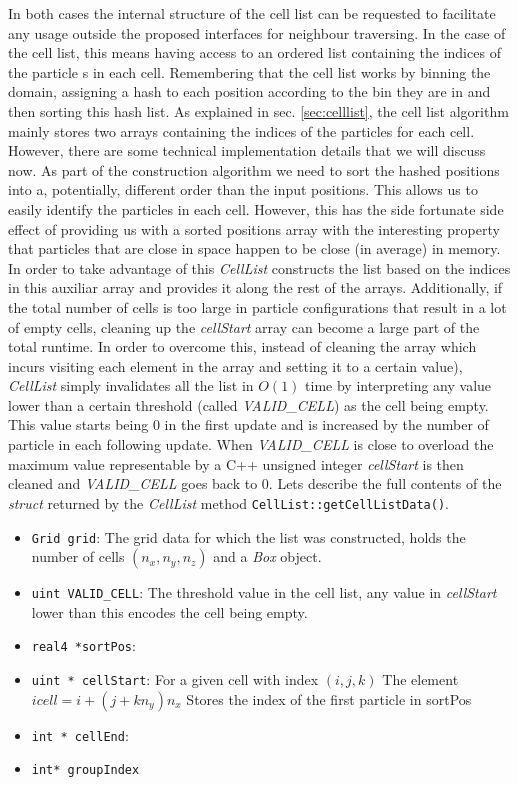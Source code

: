 \documentclass[ twoside,openright,titlepage,numbers=noenddot,%
headinclude,footinclude,cleardoublepage=empty,abstract=on,
BCOR=5mm,paper=a4,fontsize=11pt, dvipsnames
]{scrreprt}
\begin{document}
In both cases the internal structure of the cell list can be requested to facilitate any usage outside the proposed interfaces for neighbour traversing. In the case of the cell list, this means having access to an ordered list containing the indices of the particle s in each cell. Remembering that the cell list works by binning the domain, assigning a hash to each position according to the bin they are in and then sorting this hash list.
As explained in sec. \ref{sec:celllist}, the cell list algorithm mainly stores two arrays containing the indices of the particles for each cell.
However, there are some technical implementation details that we will discuss now.
As part of the construction algorithm we need to sort the hashed positions into a, potentially, different order than the input positions. This allows us to easily identify the particles in each cell. However, this has the side fortunate side effect of providing us with a sorted positions array with the interesting property that particles that are close in space happen to be close (in average) in memory. In order to take advantage of this \emph{CellList} constructs the list based on the indices in this auxiliar array and provides it along the rest of the arrays.
Additionally, if the total number of cells is too large in particle configurations that result in a lot of empty cells, cleaning up the \emph{cellStart} array can become a large part of the total runtime. In order to overcome this, instead of cleaning the array which incurs visiting each element in the array and setting it to a certain value), \emph{CellList} simply invalidates all the list in $O(1)$ time by interpreting any value lower than a certain threshold (called \emph{VALID\_CELL}) as the cell being empty.
This value starts being $0$ in the first update and is increased by the number of particle in each following update. When \emph{VALID\_CELL} is close to overload the maximum value representable by a C++ unsigned integer \emph{cellStart} is then cleaned and \emph{VALID\_CELL} goes back to $0$.
Lets describe the full contents of the \emph{struct} returned by the \emph{CellList} method \texttt{CellList::getCellListData()}.
\begin{itemize}
\item\texttt{Grid grid}:
  The grid data for which the list was constructed, holds the number of cells $(n_x, n_y, n_z)$ and a \emph{Box} object.
\item\texttt{uint VALID_CELL}:
  The threshold value in the cell list, any value in \emph{cellStart} lower than this encodes the cell being empty.
\item\texttt{real4 *sortPos}:
  
\item\texttt{uint * cellStart}:
  For a given cell with index $(i,j,k)$ The element $icell = i + (j + kn_y)n_x$ Stores the index of the first particle in sortPos 
\item\texttt{int  * cellEnd}:
\item\texttt{int* groupIndex}
\end{itemize}
\end{document}
